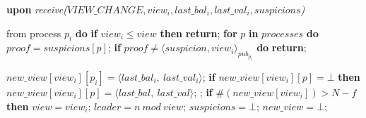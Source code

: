 \begin{algorithm}
\begin{algorithmic}[1]
		\State\textbf{upon} \textit{receive($VIEW\_CHANGE, view_i, last\_bal_i, last\_val_i, suspicions$)} 
		\item[] from process $p_i$ \textbf{do} 
		\State \hspace{\algorithmicindent} \textbf{if} $view_i \leq view$ \textbf{then}
		\State \hspace{\algorithmicindent}\hspace{\algorithmicindent}\textbf{return};
		\State
		\State \hspace{\algorithmicindent} \textbf{for} $p$ \textbf{in} $processes$ \textbf{do} 
		\State \hspace{\algorithmicindent}\hspace{\algorithmicindent} $proof = suspicions[p]$;
		\State \hspace{\algorithmicindent}\hspace{\algorithmicindent} \textbf{if} $proof \neq \langle suspicion, view_i \rangle_{pub_{p_i}}$ \textbf{do}
		\State \hspace{\algorithmicindent}\hspace{\algorithmicindent}\hspace{\algorithmicindent} \textbf{return};
		
		\State
		\State\hspace{\algorithmicindent} $new\_view[view_i][p_i] = \langle last\_bal_i,\ last\_val_i \rangle$;
		\State\hspace{\algorithmicindent} \textbf{if} $new\_view[view_i][p] = \bot$ \textbf{then}
		\State\hspace{\algorithmicindent}\hspace{\algorithmicindent} $new\_view[view_i][p] = \langle last\_bal,\ last\_val \rangle$;
		\State\hspace{\algorithmicindent}\hspace{\algorithmicindent}  ;
		\State
		\State\hspace{\algorithmicindent} \textbf{if} $\#(new\_view[view_i]) > N-f$ \textbf{then}
		\State\hspace{\algorithmicindent}\hspace{\algorithmicindent} $view = view_i$;
		\State\hspace{\algorithmicindent}\hspace{\algorithmicindent} $leader = n\ mod\ view$;
		\State\hspace{\algorithmicindent}\hspace{\algorithmicindent} $suspicions = \bot$;
		\State\hspace{\algorithmicindent}\hspace{\algorithmicindent} $new\_view = \bot$;


\end{algorithmic}
\end{algorithm}
